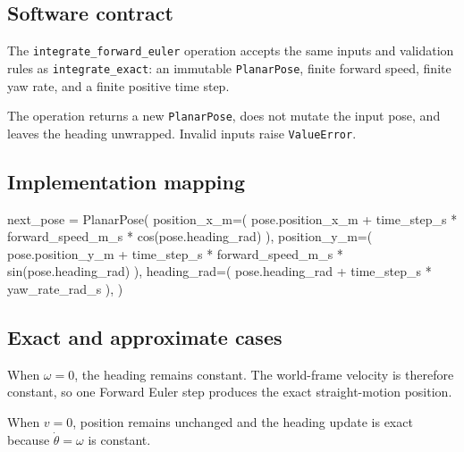 \documentclass[
  australian,
  12pt,
  letterpaper,
  DIV=11,
  numbers=noendperiod,
  twoside]{scrreprt}
\newenvironment{Shaded}{\begin{snugshade}}{\end{snugshade}}
\newcommand{\NormalTok}[1]{\textcolor[rgb]{0.00,0.23,0.31}{#1}}
\newcommand{\OperatorTok}[1]{\textcolor[rgb]{0.37,0.37,0.37}{#1}}
\begin{document}
\subsection{Software contract}\label{software-contract-3}

The \texttt{integrate\_forward\_euler} operation accepts the same inputs
and validation rules as \texttt{integrate\_exact}: an immutable
\texttt{PlanarPose}, finite forward speed, finite yaw rate, and a finite
positive time step.

The operation returns a new \texttt{PlanarPose}, does not mutate the
input pose, and leaves the heading unwrapped. Invalid inputs raise
\texttt{ValueError}.

\subsection{Implementation mapping}\label{implementation-mapping-1}

\begin{Shaded}
\begin{Highlighting}[]
\NormalTok{next\_pose }\OperatorTok{=}\NormalTok{ PlanarPose(}
\NormalTok{    position\_x\_m}\OperatorTok{=}\NormalTok{(}
\NormalTok{        pose.position\_x\_m}
        \OperatorTok{+}\NormalTok{ time\_step\_s }\OperatorTok{*}\NormalTok{ forward\_speed\_m\_s }\OperatorTok{*}\NormalTok{ cos(pose.heading\_rad)}
\NormalTok{    ),}
\NormalTok{    position\_y\_m}\OperatorTok{=}\NormalTok{(}
\NormalTok{        pose.position\_y\_m}
        \OperatorTok{+}\NormalTok{ time\_step\_s }\OperatorTok{*}\NormalTok{ forward\_speed\_m\_s }\OperatorTok{*}\NormalTok{ sin(pose.heading\_rad)}
\NormalTok{    ),}
\NormalTok{    heading\_rad}\OperatorTok{=}\NormalTok{(}
\NormalTok{        pose.heading\_rad }\OperatorTok{+}\NormalTok{ time\_step\_s }\OperatorTok{*}\NormalTok{ yaw\_rate\_rad\_s}
\NormalTok{    ),}
\NormalTok{)}
\end{Highlighting}
\end{Shaded}

\subsection{Exact and approximate
cases}\label{exact-and-approximate-cases}

When \(\omega=0\), the heading remains constant. The world-frame
velocity is therefore constant, so one Forward Euler step produces the
exact straight-motion position.

When \(v=0\), position remains unchanged and the heading update is exact
because \(\dot\theta=\omega\) is constant.
\end{document}

